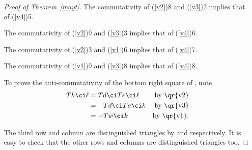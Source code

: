 \documentclass[12pt]{article}
\theoremstyle{remark}
\theoremstyle{definition}
\begin{document}
\begin{proof}[Proof of Theorem~\ref{mayt}]
The commutativity of (\ref{v2})8 and (\ref{v3})2 implies that of (\ref{v4})5. 

The commutativity of (\ref{v2})9 and (\ref{v3})3 implies that of (\ref{v4})6. 

The commutativity of (\ref{v2})3 and (\ref{v1})6 implies that of (\ref{v4})7. 

The commutativity of (\ref{v1})9 and (\ref{v3})8 implies that of (\ref{v4})8. 

To prove the anti-commutativity of the bottom right square of , note 
\begin{align*}
Th\ci\ell&=Td\ci Te\ci\ell&\text{by \qr{v2}}\\ 
&=-Td\ci Ta\ci k&\text{by \qr{v3}}\\  
&=-Tw\ci k&\text{by \qr{v1}}.
\end{align*} 

The third row and column are distinguished triangles by  and  respectively. It is easy to check that the other rows and columns are distinguished triangles too.
\end{proof}


\end{document}

